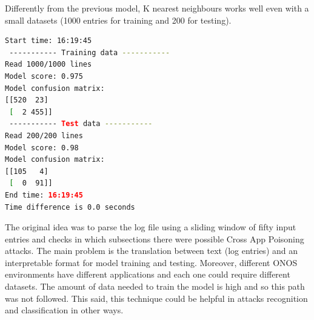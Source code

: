 Differently from the previous model, K nearest neighbours works well even with a small datasets (1000 entries for training and 200 for testing).
\begin{lstlisting}[language=bash]
Start time: 16:19:45
 ----------- Training data -----------
Read 1000/1000 lines
Model score: 0.975
Model confusion matrix: 
[[520  23]
 [  2 455]]
 ----------- Test data -----------
Read 200/200 lines
Model score: 0.98
Model confusion matrix: 
[[105   4]
 [  0  91]]
End time: 16:19:45
Time difference is 0.0 seconds
\end{lstlisting}

The original idea was to parse the log file using a sliding window of fifty input entries and checks in which subsections there were possible Cross App Poisoning attacks. The main problem is the translation between text (log entries) and an interpretable format for model training and testing. Moreover, different ONOS environments have different applications and each one could require different datasets. The amount of data needed to train the model is high and so this path was not followed. This said, this technique could be helpful in attacks recognition and classification in other ways.


\clearpage

